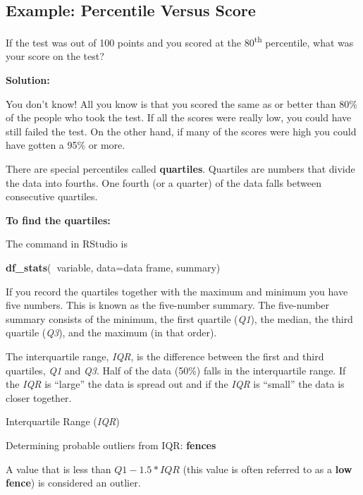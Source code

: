 \documentclass[
]{book}
\newenvironment{Shaded}{\begin{snugshade}}{\end{snugshade}}
\newcommand{\DataTypeTok}[1]{\textcolor[rgb]{0.13,0.29,0.53}{#1}}
\newcommand{\KeywordTok}[1]{\textcolor[rgb]{0.13,0.29,0.53}{\textbf{#1}}}
\newcommand{\NormalTok}[1]{#1}
\newcommand{\OperatorTok}[1]{\textcolor[rgb]{0.81,0.36,0.00}{\textbf{#1}}}
\begin{document}
\hypertarget{example-percentile-versus-score}{%
\subsection{Example: Percentile Versus Score}\label{example-percentile-versus-score}}

If the test was out of 100 points and you scored at the 80\textsuperscript{th} percentile, what was your score on the test?

\textbf{Solution:}

You don't know! All you know is that you scored the same as or better than 80\% of the people who took the test. If all the scores were really low, you could have still failed the test. On the other hand, if many of the scores were high you could have gotten a 95\% or more.

There are special percentiles called \textbf{quartiles}. Quartiles are numbers that divide the data into fourths. One fourth (or a quarter) of the data falls between consecutive quartiles.

\textbf{To find the quartiles:}

The command in RStudio is

\begin{Shaded}
\begin{Highlighting}[]
\KeywordTok{df_stats}\NormalTok{(}\OperatorTok{~}\NormalTok{variable, }\DataTypeTok{data=}\NormalTok{data frame, summary)}
\end{Highlighting}
\end{Shaded}

If you record the quartiles together with the maximum and minimum you have five numbers. This is known as the five-number summary. The five-number summary consists of the minimum, the first quartile (\emph{Q1}),
the median, the third quartile (\emph{Q3}), and the maximum (in that order).

The interquartile range, \emph{IQR}, is the difference between the first and third quartiles, \emph{Q1} and \emph{Q3}. Half of the data (50\%) falls in the interquartile range. If the \emph{IQR} is ``large'' the data is spread out and if the \emph{IQR} is ``small'' the data is closer together.

Interquartile Range (\emph{IQR})

Determining probable outliers from IQR: \textbf{fences}

A value that is less than \(Q1-1.5*IQR\) (this value is often referred to as a \textbf{low} \textbf{fence}) is considered an outlier.
\end{document}
